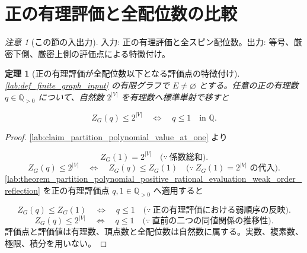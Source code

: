 \documentclass[11pt,a4paper]{article}
\newtheorem{theorem}[definition]{定理}
\theoremstyle{remark}
\newtheorem{remark}[definition]{注意}
\begin{document}
\section{正の有理評価と全配位数の比較}

\begin{remark}[この節の入出力]
入力: 正の有理評価と全スピン配位数。出力: 等号、厳密下側、厳密上側の評価点による特徴付け。

\end{remark}

\begin{theorem}[正の有理評価が全配位数以下となる評価点の特徴付け]\label{lab:theorem_partition_polynomial_positive_rational_evaluation_at_most_configuration_count}
\cref{lab:def_finite_graph_input}
 の有限グラフで 
$E\ne\varnothing$
 とする。任意の正の有理数 
$q\in\mathbb Q_{>0}$
 について、自然数 
$2^{|V|}$
 を有理数へ標準単射で移すと

\[Z_G(q)\le 2^{|V|}\quad\Longleftrightarrow\quad q\le1\quad\text{in }\mathbb Q.\]
\end{theorem}
\begin{proof}
\cref{lab:claim_partition_polynomial_value_at_one}
 より

\[Z_G(1)=2^{|V|}
\quad\bigl(\because\ \text{係数総和}\bigr).\]
\[Z_G(q)\le2^{|V|}
\quad\Longleftrightarrow\quad
Z_G(q)\le Z_G(1)
\quad\bigl(\because\ Z_G(1)=2^{|V|}\text{ の代入}\bigr).\]
\cref{lab:theorem_partition_polynomial_positive_rational_evaluation_weak_order_reflection}
 を正の有理評価点 
$q,1\in\mathbb Q_{>0}$
 へ適用すると

\[Z_G(q)\le Z_G(1)
\quad\Longleftrightarrow\quad
q\le1
\quad\bigl(\because\ \text{正の有理評価における弱順序の反映}\bigr).\]
\[Z_G(q)\le2^{|V|}
\quad\Longleftrightarrow\quad
q\le1
\quad\bigl(\because\ \text{直前の二つの同値関係の推移性}\bigr).\]
評価点と評価値は有理数、頂点数と全配位数は自然数に属する。実数、複素数、極限、積分を用いない。

\end{proof}
\end{document}
